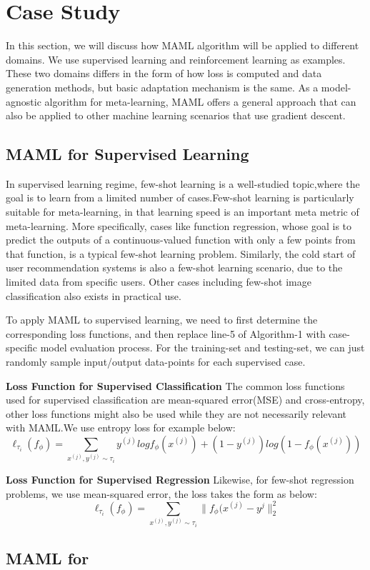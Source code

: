 \section{Case Study}

In this section, we will discuss how MAML algorithm will be applied to different domains. We use supervised learning and reinforcement learning as examples. These two domains differs in the form of how loss is computed and data generation methods, but basic adaptation mechanism is the same. As a model-agnostic algorithm for meta-learning, MAML offers a general approach that can also be applied to other machine learning scenarios that use gradient descent.

\subsection{MAML for Supervised Learning}

In supervised learning regime, few-shot learning is a well-studied topic,where the goal is to learn from a limited number of cases.Few-shot learning is particularly suitable for meta-learning, in that learning speed is an important meta metric of meta-learning. More specifically, cases like function regression, whose goal is to predict the outputs of a continuous-valued function with only a few points from that function, is a typical few-shot learning problem. Similarly, the cold start of user  recommendation systems is also a few-shot learning scenario, due to the limited data from specific users. Other cases including few-shot image classification also exists in practical use.

To apply MAML to supervised learning, we need to first determine the corresponding loss functions, and then replace line-5 of Algorithm-1 with case-specific model evaluation process. For the training-set and testing-set, we can just randomly sample input/output data-points for each supervised case. 

\textbf{Loss Function for Supervised Classification}
The common loss functions used for supervised classification are mean-squared error(MSE) and cross-entropy, other loss functions might also be used while they are not necessarily relevant with MAML.We use entropy loss for example below:
\begin{equation}
    \ell_{\tau_i}(f_\phi) = \sum_{x^{(j)},y^{(j)}\sim\tau_i} y^{(j)}log{f_\phi}(x^{(j)}) + (1-y^{(j)})log(1-f_\phi(x^{(j)}))
    \tag{3}
\end{equation}

\textbf{Loss Function for Supervised Regression}
Likewise, for few-shot regression problems, we use mean-squared error, the loss takes the form as below:
\begin{equation}
    \ell_{\tau_i}(f_\phi) = \sum_{x^{(j)},y^{(j)}\sim\tau_i} \parallel f_\phi(x^{(j)} - y^{j} \parallel_2^2 
    \tag{4}
\end{equation}

\subsection{MAML for }


